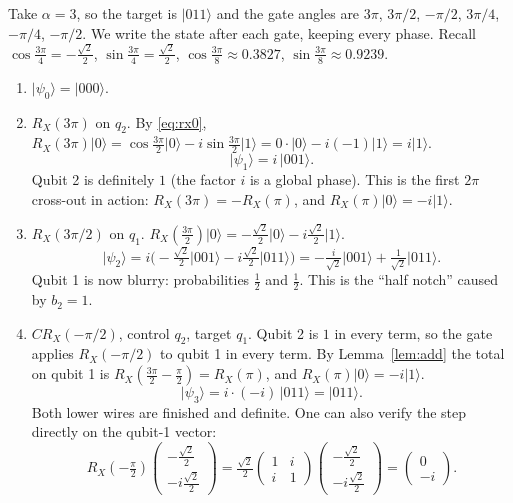 \documentclass[11pt,a4paper]{article}
\newcommand{\ket}[1]{\lvert #1 \rangle}
\newcommand{\RX}{R_X}
\newcommand{\CRX}{CR_X}
\theoremstyle{plain}
\theoremstyle{definition}
\theoremstyle{remark}
\begin{document}
Take $\alpha = 3$, so the target is $\ket{011}$ and the gate angles are $3\pi$, $3\pi/2$,
$-\pi/2$, $3\pi/4$, $-\pi/4$, $-\pi/2$. We write the state after each gate, keeping every phase.
Recall $\cos\frac{3\pi}{4} = -\frac{\sqrt2}{2}$, $\sin\frac{3\pi}{4} = \frac{\sqrt2}{2}$,
$\cos\frac{3\pi}{8}\approx 0.3827$, $\sin\frac{3\pi}{8}\approx 0.9239$.

\begin{enumerate}[label=\textbf{Gate \arabic*.},leftmargin=2.1cm,itemsep=5pt]
\item[\textbf{Start.}] $\ket{\psi_0} = \ket{000}$.
\item $\RX(3\pi)$ on $q_2$. By \eqref{eq:rx0}, $\RX(3\pi)\ket{0} = \cos\frac{3\pi}{2}\ket{0} - i\sin\frac{3\pi}{2}\ket{1} = 0\cdot\ket{0} - i(-1)\ket{1} = i\ket{1}$.
      \[\ket{\psi_1} = i\,\ket{001}.\]
      Qubit 2 is definitely $1$ (the factor $i$ is a global phase). This is the first $2\pi$
      cross-out in action: $\RX(3\pi) = -\RX(\pi)$, and $\RX(\pi)\ket{0} = -i\ket{1}$.
\item $\RX(3\pi/2)$ on $q_1$. $\RX(\tfrac{3\pi}{2})\ket{0} = -\frac{\sqrt2}{2}\ket{0} - i\frac{\sqrt2}{2}\ket{1}$.
      \[\ket{\psi_2} = i\Big(-\tfrac{\sqrt2}{2}\ket{001} - i\tfrac{\sqrt2}{2}\ket{011}\Big)
                     = -\tfrac{i}{\sqrt2}\ket{001} + \tfrac{1}{\sqrt2}\ket{011}.\]
      Qubit 1 is now blurry: probabilities $\frac12$ and $\frac12$. This is the ``half notch''
      caused by $b_2 = 1$.
\item $\CRX(-\pi/2)$, control $q_2$, target $q_1$. Qubit 2 is $1$ in every term, so the gate
      applies $\RX(-\pi/2)$ to qubit 1 in every term. By Lemma~\ref{lem:add} the total on qubit 1
      is $\RX(\tfrac{3\pi}{2} - \tfrac{\pi}{2}) = \RX(\pi)$, and $\RX(\pi)\ket{0} = -i\ket{1}$.
      \[\ket{\psi_3} = i\cdot(-i)\,\ket{011} = \ket{011}.\]
      Both lower wires are finished and definite. One can also verify the step directly on the
      qubit-1 vector:
      \[\RX(-\tfrac{\pi}{2})\begin{pmatrix}-\tfrac{\sqrt2}{2}\\ -i\tfrac{\sqrt2}{2}\end{pmatrix}
        = \tfrac{\sqrt2}{2}\begin{pmatrix}1 & i\\ i & 1\end{pmatrix}\begin{pmatrix}-\tfrac{\sqrt2}{2}\\ -i\tfrac{\sqrt2}{2}\end{pmatrix}
        = \begin{pmatrix}0\\ -i\end{pmatrix}.\]

\end{enumerate}
\end{document}
